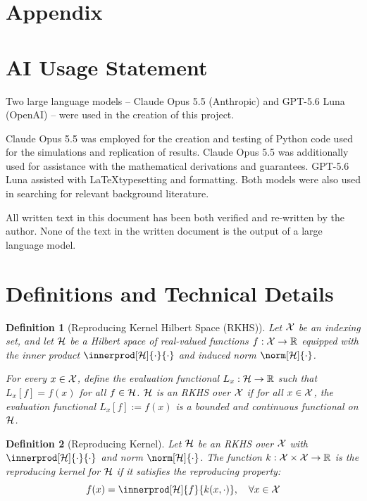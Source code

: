 \documentclass[10pt]{article}
\newtheorem{definition}{Definition}
\begin{document}
\newpage
\appendix
\section*{Appendix}

\section{AI Usage Statement}
Two large language models -- Claude Opus 5.5 (Anthropic) and GPT-5.6 Luna (OpenAI) -- were used in the creation of this project. 

Claude Opus 5.5 was employed for the creation and testing of Python code used for the simulations and replication of results. Claude Opus 5.5 was additionally used for assistance with the mathematical derivations and guarantees. GPT-5.6 Luna assisted with \LaTeX typesetting and formatting. Both models were also used in searching for relevant background literature.

All written text in this document has been both verified and re-written by the author. None of the text in the written document is the output of a large language model.

\section{Definitions and Technical Details}
\label{sec:definitions}

\begin{definition}[Reproducing Kernel Hilbert Space (RKHS)]
\label{def:rkhs}
    Let $\mathcal{X}$ be an indexing set, and let $\mathcal{H}$ be a Hilbert space of real-valued functions $f: \mathcal{X} \to \mathbb{R}$ equipped with the inner product $\innerprod[\calH]{\cdot}{\cdot}$ and induced norm $\norm[\calH]{\cdot}$. 
    
    For every $x \in \mathcal{X}$, define the evaluation functional $L_{x}: \mathcal{H} \to \mathbb{R}$ such that $L_{x}[f] = f(x)$ for all $f \in \mathcal{H}$. $\mathcal{H}$ is an RKHS over $\mathcal{X}$ if for all $x \in \mathcal{X}$, the evaluation functional $L_{x}[f] := f(x)$ is a bounded and continuous functional on $\mathcal{H}$. 
\end{definition}

\begin{definition}[Reproducing Kernel]
\label{def:reproducing-kernel}
    Let $\mathcal{H}$ be an RKHS over $\mathcal{X}$ with $\innerprod[\calH]{\cdot}{\cdot}$ and norm $\norm[\calH]{\cdot}$. The function $k: \mathcal{X} \times \mathcal{X} \to \mathbb{R}$ is the reproducing kernel for $\mathcal{H}$ if it satisfies the reproducing property:
    \begin{equation}
        f(x) = \innerprod[\calH]{f}{k(x, \cdot)}, \quad \forall x \in \calX
    \end{equation}
\end{definition}
\end{document}
